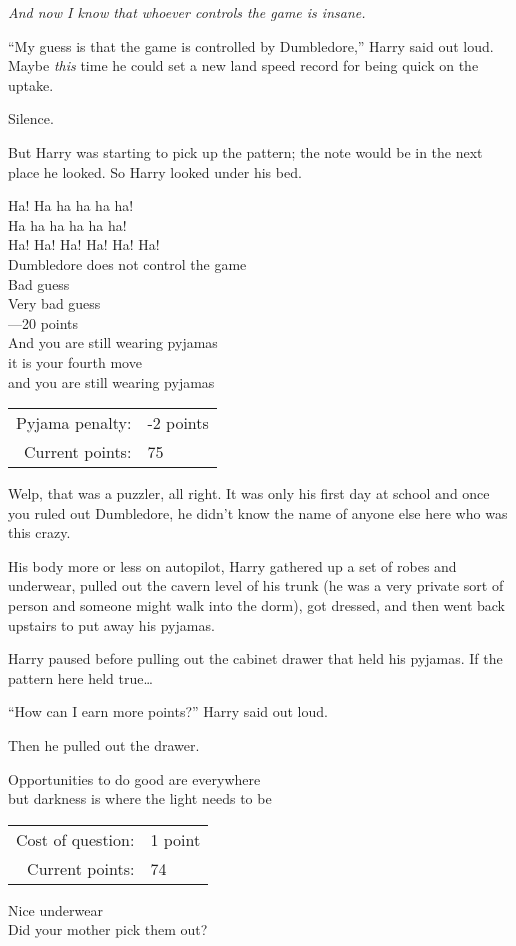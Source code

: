 \emph{And now I know that whoever controls the game is insane.}

“My guess is that the game is controlled by Dumbledore,” Harry said out loud. Maybe \emph{this} time he could set a new land speed record for being quick on the uptake.

Silence.

But Harry was starting to pick up the pattern; the note would be in the next place he looked. So Harry looked under his bed.
\begin{writtenNote}
Ha! Ha ha ha ha ha!\\
Ha ha ha ha ha ha!\\
Ha! Ha! Ha! Ha! Ha! Ha!\\
Dumbledore does not control the game\\
Bad guess\\
Very bad guess\\
—20 points\\
And you are still wearing pyjamas\\
it is your fourth move\\
and you are still wearing pyjamas

\begin{tabular}{rl}
Pyjama penalty: & -2 points\\
Current points: & 75
\end{tabular}
\end{writtenNote}

Welp, that was a puzzler, all right. It was only his first day at school and once you ruled out Dumbledore, he didn’t know the name of anyone else here who was this crazy.

His body more or less on autopilot, Harry gathered up a set of robes and underwear, pulled out the cavern level of his trunk (he was a very private sort of person and someone might walk into the dorm), got dressed, and then went back upstairs to put away his pyjamas.

Harry paused before pulling out the cabinet drawer that held his pyjamas. If the pattern here held true…

“How can I earn more points?” Harry said out loud.

Then he pulled out the drawer.
\begin{writtenNote}
Opportunities to do good are everywhere\\
but darkness is where the light needs to be

\begin{tabular}{rl}
Cost of question: & 1 point\\
Current points: & 74
\end{tabular}

Nice underwear\\
Did your mother pick them out?\\
\end{writtenNote}

